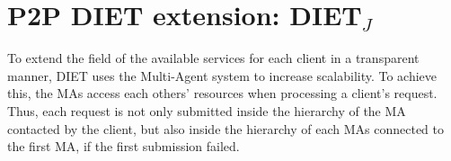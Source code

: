 
\chapter{P2P DIET extension: DIET$_{J}$}
\label{ch:p2pextension}

To extend the field of the available services for each client in a
transparent manner, DIET uses the Multi-Agent system to increase
scalability. To achieve this, the MAs access each others' resources
when processing a client's request. Thus, each request is not only
submitted inside the hierarchy of the MA contacted by the client, but
also inside the hierarchy of each MAs connected to the first MA, if the
first submission failed.

